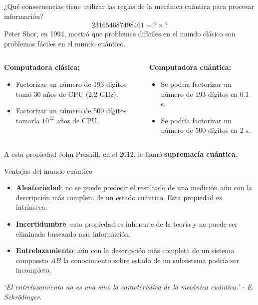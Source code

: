 \documentclass[11pt]{beamer}
\begin{document}
\begin{frame}
¿Qué consecuencias tiene utilizar las reglas de la mecánica cuántica para
procesar información?
	\begin{align*}
		231654687498461 = ? \times ?
	\end{align*}\vfill
	Peter Shor, en 1994, mostró que problemas difíciles en el mundo clásico son
	problemas fáciles en el mundo cuántico. \vfill
	\begin{columns}
	\begin{column}{0.5\textwidth}
		\vfill
  	\begin{center}
  		\textbf{Computadora clásica:}
  	\end{center}
  	\begin{itemize}
  		\item Factorizar un número de 193 dígitos tomó 30 años de CPU (2.2 GHz). 
  		\item Factorizar un número de 500 dígitos tomaría $10^{12}$ años de CPU.
  	\end{itemize}
	\end{column}
	\begin{column}{0.5\textwidth}  %
  	\begin{center}
  		\textbf{Computadora cuántica:}
  	\end{center}
  	\begin{itemize}
  		\item Se podría factorizar un número de 193 dígitos en 0.1 s. 
  		\item Se podría factorizar un número de 500 dígitos en 2 s. 
  	\end{itemize}
  	\vspace{15pt}
	\end{column}
	\end{columns}\vfill
	\vspace{20pt}
	A esta propiedad John Preskill, en el 2012, le llamó 
	\textbf{supremacía cuántica}. \vfill
\end{frame}

\begin{frame}{Ventajas del mundo cuántico}
	\begin{itemize}
		\item \textbf{Aleatoriedad}: no se puede predecir el resultado de una 
						medición aún con la descripción más completa de un estado cuántico.
						Esta propiedad es intrínseca.
		
		\item \textbf{Incertidumbre}: esta propiedad es inherente de la teoría y 
						no puede ser eliminada buscando más información.
		
		\item \textbf{Entrelazamiento}: aún con la descripción más completa de un
									sistema compuesto $AB$ la conocimiento sobre estado de un 
									subsistema podría ser incompleto. 
	\end{itemize}\vfill
	
	\emph{`El entrelazamiento no es una sino la característica de la
	mecánica cuántica.' - E. Schrödinger.}
\end{frame}
\end{document}
